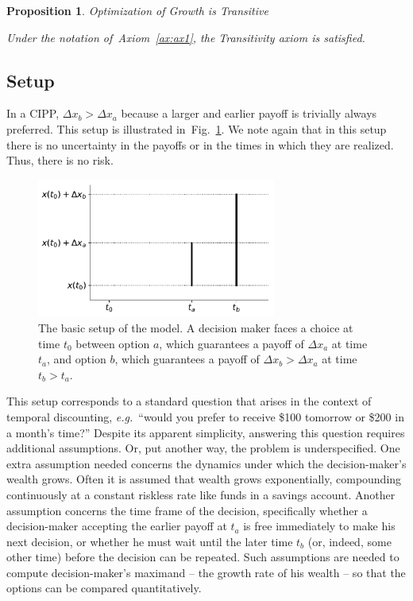 \documentclass[11pt]{article}
\newtheorem{proposition}{Proposition}
\newcommand{\Aref}[1]{Axiom~\ref{ax:#1}}
\newcommand{\eg}{{\it e.g.}\ }
\newcommand{\flabel}[1]{\label{fig:#1}}
\newcommand{\fref}[1]{Fig.~\ref{fig:#1}}
\newcommand{\Dx}{\Delta x}
\numberwithin{equation}{section}
\begin{document}
\begin{proposition}{Optimization of Growth is Transitive}

Under the notation of~\Aref{ax1}, the Transitivity axiom is satisfied.
\label{prop:trans}
\end{proposition}

\subsection{Setup}

In a CIPP, $\Dx_b>\Dx_a$ because a larger and earlier payoff is trivially always preferred. This setup is illustrated in~\fref{basicsetup}. We note again that in this setup there is no uncertainty in the payoffs or in the times in which they are realized. Thus, there is no risk.

\begin{figure}[!htb]
\centering
\includegraphics[width=0.7\textwidth]{./figures/setup.pdf}
\caption{
The basic setup of the model. A decision maker faces a choice at time $t_0$ between option $a$, which guarantees a payoff of $\Dx_a$ at time $t_a$, and option $b$, which guarantees a payoff of $\Dx_b>\Dx_a$ at time $t_b>t_a$.
}
\flabel{basicsetup}
\end{figure}

This setup corresponds to a standard question that arises in the context of temporal discounting, \eg ``would you prefer to receive \$100 tomorrow or \$200 in a month's time?'' Despite its apparent simplicity, answering this question requires additional assumptions. Or, put another way, the problem is underspecified. One extra assumption needed concerns the dynamics under which the decision-maker's wealth grows. Often it is assumed that wealth grows exponentially, compounding continuously at a constant riskless rate like funds in a savings account. Another assumption concerns the time frame of the decision, specifically whether a decision-maker accepting the earlier payoff at $t_a$ is free immediately to make his next decision, or whether he must wait until the later time $t_b$ (or, indeed, some other time) before the decision can be repeated. Such assumptions are needed to compute decision-maker's maximand -- the growth rate of his wealth -- so that the options can be compared quantitatively.
\end{document}
